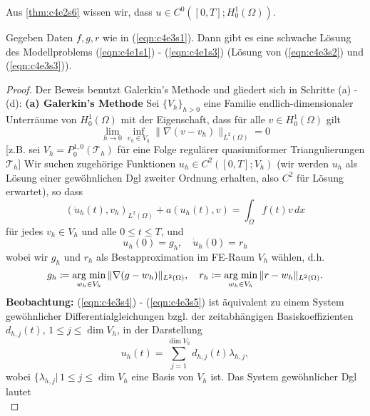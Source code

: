 \documentclass[../skript.tex]{subfiles}
\begin{document}
\begin{remark}\label{rem:c4e3s2}
	Aus \cref{thm:c4e2s6} wissen wir, dass $u\in C^0([0,T];H^1_0(\Omega))$.
\end{remark}

\begin{theorem}\label{thm:c4e3s3}
	Gegeben Daten $f,g,r$ wie in (\ref{eqn:c4e3s1}). Dann gibt es eine schwache Lösung des Modellproblems (\ref{eqn:c4e1s1}) - (\ref{eqn:c4e1s3}) (Lösung von (\ref{eqn:c4e3s2}) und (\ref{eqn:c4e3s3})).
\end{theorem}

\begin{proof}
	Der Beweis benutzt Galerkin's Methode und gliedert sich in Schritte (a) - (d):\newline\newline\noindent
	\textbf{(a) Galerkin's Methode  } Sei $\{V_h\}_{h>0}$ eine Familie endlich-dimensionaler Unterräume von $H^1_0(\Omega)$ mit der Eigenschaft, dass für alle $v\in H^1_0(\Omega)$ gilt
	\[
		\lim_{h\to 0}\inf_{v_h\in V_h} \|\nabla(v-v_h)\|_{L^2(\Omega)} = 0
	\]	
	[z.B. sei $V_h = P^{1,0}_0(\mathcal{T}_h)$ für eine Folge regulärer quasiuniformer Triangulierungen $\mathcal{T}_h$]\newline\noindent
	Wir suchen zugehörige Funktionen $u_h\in C^2([0,T];V_h)$ (wir werden $u_h$ als Lösung einer gewöhnlichen Dgl zweiter Ordnung erhalten, also $C^2$ für Lösung erwartet), so dass 
	\begin{equation}\label{eqn:c4e3s4}
		(\ddot{u}_h (t), v_h)_{L^2(\Omega)} + a(u_h(t),v) = \int_\Omega f(t)v\,dx
	\end{equation}
	für jedes $v_h\in V_h$ und alle $0\leq t\leq T$, und 
	\begin{equation}\label{eqn:c4e3s5}
		u_h(0) = g_h, \quad\dot{u}_h(0) = r_h
	\end{equation} 
	wobei wir $g_h$ und $r_h$ als Bestapproximation im FE-Raum $V_h$ wählen, d.h.
	\[
		g_h\coloneqq \operatorname*{arg\;min}_{w_h\in V_h} \|\nabla (g-w_h)\|_{L^2(\Omega)},\quad r_h\coloneqq\operatorname*{arg\;min}_{w_h\in V_h}\|r-w_h\|_{L^2(\Omega)}.
	\]
	\textbf{Beobachtung: } (\ref{eqn:c4e3s4}) - (\ref{eqn:c4e3s5}) ist äquivalent zu einem System gewöhnlicher Differentialgleichungen bzgl. der zeitabhängigen Basiskoeffizienten $d_{h,j}(t),\,1\leq j\leq\dim{V_h}$, in der Darstellung
	\[
		u_h(t) = \sum_{j=1}^{\dim{V_h}} d_{h,j}(t)\lambda_{h,j},
	\]
	wobei $\{\lambda_{h,j}|\,1\leq j\leq\dim{V_h}$ eine Basis von $V_h$ ist. Das System gewöhnlicher Dgl lautet
	\begin{equation}\label{eqn:c4e3s7}

\end{equation}
\end{proof}
\end{document}
